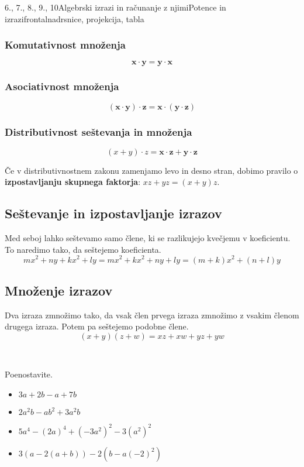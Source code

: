 \begin{priprava}{6., 7., 8., 9., 10}{}{Algebrski izrazi in računanje z njimi}{Potence in izrazi}{frontalna}{drsnice, projekcija, tabla}
\begin{multicols}{2}
        \subsubsection*{Komutativnost množenja}
       $$ \mathbf{x\cdot y=y\cdot x}$$
    

       \subsubsection*{Asociativnost množenja}
        $$ \mathbf{(x\cdot y)\cdot z=x\cdot (y\cdot z)}$$
    
    \end{multicols}


    \subsubsection*{Distributivnost seštevanja in množenja}
        $$ (x+y)\cdot z=\mathbf{x\cdot z+y\cdot z} $$
    




    Če v distributivnostnem zakonu zamenjamo levo in desno stran, dobimo pravilo o \textbf{izpostavljanju skupnega faktorja}: $xz+yz=(x+y)z$.


\subsection{Seštevanje in izpostavljanje izrazov}
    Med seboj lahko seštevamo samo člene, ki se razlikujejo kvečjemu v koeficientu. To naredimo tako, da seštejemo koeficienta.
    $$mx^2+ny+kx^2+ly=mx^2+kx^2+ny+ly=(m+k)x^2+(n+l)y $$


\subsection{Množenje izrazov}
    Dva izraza zmnožimo tako, da vsak člen prvega izraza zmnožimo z vsakim členom drugega izraza. Potem pa seštejemo podobne člene.
    $$(x+y)(z+w)=xz+xw+yz+yw $$


~\\
\begin{multicols}{2}
    

\begin{naloga}
    Poenostavite.
    \begin{itemize}
        \item $3a+2b-a+7b$ 
        \item $2a^2b-ab^2+3a^2b$ 
        \item $5a^4-(2a)^4+(-3a^2)^2-3(a^2)^2$ 
        \item $3(a-2(a+b))-2(b-a(-2)^2)$ 
    \end{itemize}
\end{naloga}


\end{multicols}
\end{priprava}
